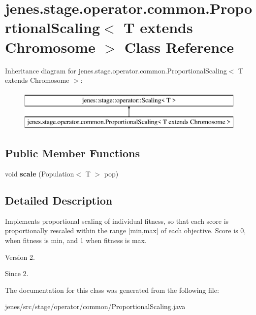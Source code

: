 \hypertarget{classjenes_1_1stage_1_1operator_1_1common_1_1_proportional_scaling_3_01_t_01extends_01_chromosome_01_4}{\section{jenes.\-stage.\-operator.\-common.\-Proportional\-Scaling$<$ T extends Chromosome $>$ Class Reference}
\label{classjenes_1_1stage_1_1operator_1_1common_1_1_proportional_scaling_3_01_t_01extends_01_chromosome_01_4}
}
Inheritance diagram for jenes.\-stage.\-operator.\-common.\-Proportional\-Scaling$<$ T extends Chromosome $>$\-:\begin{figure}[H]
\begin{center}
\leavevmode
\includegraphics[height=2.000000cm]{classjenes_1_1stage_1_1operator_1_1common_1_1_proportional_scaling_3_01_t_01extends_01_chromosome_01_4}
\end{center}
\end{figure}
\subsection*{Public Member Functions}
\begin{DoxyCompactItemize}
\item 
\hypertarget{classjenes_1_1stage_1_1operator_1_1common_1_1_proportional_scaling_3_01_t_01extends_01_chromosome_01_4_a5b8ae9f116348cebc390e0a58602a704}{void {\bfseries scale} (Population$<$ T $>$ pop)}\label{classjenes_1_1stage_1_1operator_1_1common_1_1_proportional_scaling_3_01_t_01extends_01_chromosome_01_4_a5b8ae9f116348cebc390e0a58602a704}

\end{DoxyCompactItemize}


\subsection{Detailed Description}
Implements proportional scaling of individual fitness, so that each score is proportionally rescaled within the range \mbox{[}min,max\mbox{]} of each objective. Score is 0, when fitness is min, and 1 when fitness is max.

\begin{DoxyVersion}{Version}
2. 
\end{DoxyVersion}
\begin{DoxySince}{Since}
2. 
\end{DoxySince}


The documentation for this class was generated from the following file\-:\begin{DoxyCompactItemize}
\item 
jenes/src/stage/operator/common/Proportional\-Scaling.\-java\end{DoxyCompactItemize}
